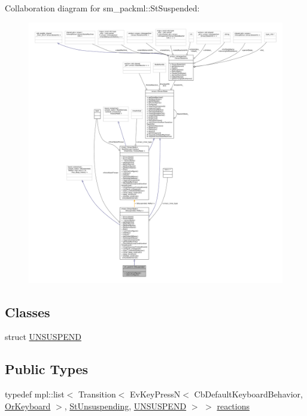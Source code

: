 Collaboration diagram for sm\+\_\+packml\+:\+:St\+Suspended\+:
\nopagebreak
\begin{figure}[H]
\begin{center}
\leavevmode
\includegraphics[width=350pt]{structsm__packml_1_1StSuspended__coll__graph}
\end{center}
\end{figure}
\subsection*{Classes}
\begin{DoxyCompactItemize}
\item 
struct \hyperlink{structsm__packml_1_1StSuspended_1_1UNSUSPEND}{U\+N\+S\+U\+S\+P\+E\+ND}
\end{DoxyCompactItemize}
\subsection*{Public Types}
\begin{DoxyCompactItemize}
\item 
typedef mpl\+::list$<$ Transition$<$ Ev\+Key\+PressN$<$ Cb\+Default\+Keyboard\+Behavior, \hyperlink{classsm__packml_1_1OrKeyboard}{Or\+Keyboard} $>$, \hyperlink{structsm__packml_1_1StUnsuspending}{St\+Unsuspending}, \hyperlink{structsm__packml_1_1StSuspended_1_1UNSUSPEND}{U\+N\+S\+U\+S\+P\+E\+ND} $>$ $>$ \hyperlink{structsm__packml_1_1StSuspended_ac6c9b0d11341ea90eee463202540ceb9}{reactions}
\end{DoxyCompactItemize}
